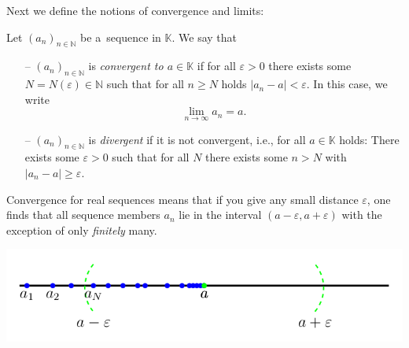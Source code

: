 

Next we define the notions of convergence and limits:
\begin{Definition}\label{def:convlim}
    Let $(a_n)_{n\in\mathbb{N}}$ be a~sequence in $\mathbb{K}$. We say that
\begin{itemize}
 \item[--] $(a_n)_{n\in\mathbb{N}}$ is \emph{convergent to $a\in \mathbb{K}$} if for all $\varepsilon>0$ there exists some $N=N(\varepsilon)\in\mathbb{N}$ such that for all $n\geq N$ holds $|a_n-a|<\varepsilon$. In this case, we write
\[\lim_{n\to\infty}a_n=a.\]
 \item[--] $(a_n)_{n\in\mathbb{N}}$ is \emph{divergent} if it is not convergent, i.e., for all $a\in \mathbb{K}$ holds: There exists some $\varepsilon>0$ such that for all $N$ there exists some $n>N$ with $|a_n-a|\geq\varepsilon$.
\end{itemize}

\end{Definition}

Convergence for real sequences means that if you give any small distance $\varepsilon$, one
finds that all sequence members $a_n$ lie in the interval $(a-\varepsilon, a+\varepsilon)$ with the exception of only \emph{finitely} many.

\includegraphics{./conv.png}

